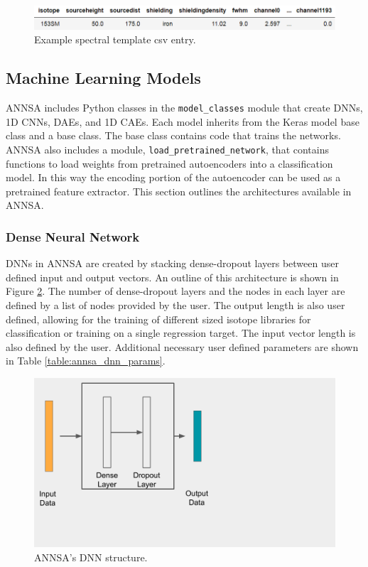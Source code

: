 \begin{figure}[H]
\centering
\includegraphics[trim=0 0 0 0,clip,width=1.0\linewidth]{images/template_csv.png}
\caption{Example spectral template csv entry.}
\label{fig:template_csv}
\end{figure}

\subsection{Machine Learning Models}

ANNSA includes Python classes in the \verb|model_classes| module that create DNNs, 1D CNNs, DAEs, and 1D CAEs. Each model inherits from the Keras model base class and a base class. The base class contains code that trains the networks. ANNSA also includes a module, \verb|load_pretrained_network|, that contains functions to load weights from pretrained autoencoders into a classification model. In this way the encoding portion of the autoencoder can be used as a pretrained feature extractor. This section outlines the architectures available in ANNSA.

\subsubsection{Dense Neural Network}

DNNs in ANNSA are created by stacking dense-dropout layers between user defined input and output vectors. An outline of this architecture is shown in Figure \ref{fig:annsa_dnn}. The number of dense-dropout layers and the nodes in each layer are defined by a list of nodes provided by the user. The output length is also user defined, allowing for the training of different sized isotope libraries for classification or training on a single regression target. The input vector length is also defined by the user. Additional necessary user defined parameters are shown in Table \ref{table:annsa_dnn_params}.

\begin{figure}[H]
\centering
\includegraphics[trim=0 110 400 0,clip,width=0.6\linewidth]{images/annsa_dnn.png}
\caption{ANNSA's DNN structure.}
\label{fig:annsa_dnn}
\end{figure}

